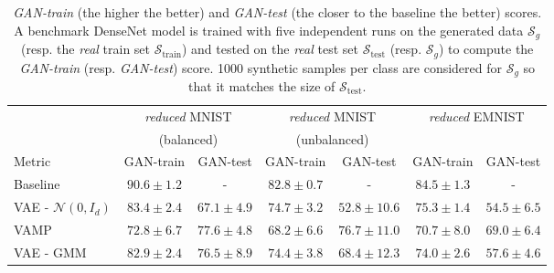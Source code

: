 \documentclass[10pt,journal,compsoc]{IEEEtran}
\begin{document}
    \begin{table*}[!ht]
      \caption{\emph{GAN-train} (the higher the better) and \emph{GAN-test} (the closer to the baseline the better) scores. A benchmark DenseNet model is trained with five independent runs on the generated data $\mathcal{S}_g$ (resp. the \emph{real} train set $\mathcal{S}_{\mathrm{train}}$) and tested on the \emph{real} test set $\mathcal{S}_{\mathrm{test}}$ (resp. $\mathcal{S}_g$) to compute the \emph{GAN-train} (resp. \emph{GAN-test}) score. 1000 synthetic samples per class are considered for $\mathcal{S}_g$ so that it matches the size of $\mathcal{S}_{\mathrm{test}}$.}
      \label{table: GAN - scores}
      \begin{center}
      \setlength{\tabcolsep}{3pt}
      \begin{tabular}{l |c c |c c |c c} 
        \cline{2-7}
        &\multicolumn{2}{c|}{\emph{reduced} MNIST} & \multicolumn{2}{c|}{\emph{reduced} MNIST} & \multicolumn{2}{c}{\multirow{2}{*}{\emph{reduced} EMNIST}} \\
        &\multicolumn{2}{c|}{(balanced)} & \multicolumn{2}{c|}{(unbalanced)} &  \\
      \hline
      Metric & GAN-train & GAN-test & GAN-train & GAN-test & GAN-train & GAN-test \\
      \hline
      \hline
      Baseline                        & $90.6 \pm 1.2 $ & - & $ 82.8 \pm 0.7 $  & - & $ 84.5  \pm 1.3 $ & - \\ 
      \hline
      VAE - $\mathcal{N}(0, I_d)$     & $83.4 \pm 2.4 $ & $ 67.1 \pm 4.9 $  & $ 74.7 \pm 3.2$  & $ 52.8 \pm 10.6 $  & $75.3 \pm 1.4$ & $ 54.5 \pm 6.5 $ \\
      VAMP                            & $72.8 \pm 6.7 $ & $ 77.6 \pm 4.8 $  & $ 68.2 \pm 6.6$  & $ 76.7 \pm 11.0  $  & $ 70.7 \pm 8.0 $ & $ 69.0 \pm 6.4 $ \\
      VAE - GMM & $82.9 \pm 2.4 $& $76.5 \pm 8.9$ & $ 74.4 \pm 3.8 $ & $ 68.4 \pm 12.3 $ & $ 74.0 \pm 2.6 $ & $ 57.6 \pm 4.6 $\\

\end{tabular}
\end{center}
\end{table*}
\end{document}
